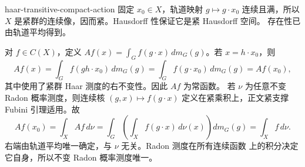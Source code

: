 \begin{solution}{haar-transitive-compact-action}
固定 $x_0\in X$，轨道映射 $g\mapsto g\cdot x_0$ 连续且满，所以
$X$ 是紧群的连续像，因而紧。Hausdorff 性保证它是紧 Hausdorff 空间。
存在性已由轨道平均得到。

对 $f\in C(X)$，定义
$Af(x)=\int_G f(g\cdot x)\,dm_G(g)$。若 $x=h\cdot x_0$，则
\[
 Af(x)=\int_G f(gh\cdot x_0)\,dm_G(g)
 =\int_G f(g\cdot x_0)\,dm_G(g)=Af(x_0),
\]
其中使用了紧群 Haar 测度的右不变性。因此 $Af$ 为常函数。
若 $\nu$ 为任意不变 Radon 概率测度，则连续核
$(g,x)\mapsto f(g\cdot x)$ 定义在紧乘积上，正文紧支撑 Fubini
引理适用。故
\[
 Af(x_0)=\int_X Af\,d\nu
 =\int_G\left(\int_X f(g\cdot x)\,d\nu(x)\right)dm_G(g)
 =\int_X f\,d\nu.
\]
右端由轨道平均唯一确定，与 $\nu$ 无关。Radon 测度在所有连续函数
上的积分决定它自身，所以不变 Radon 概率测度唯一。
\end{solution}
